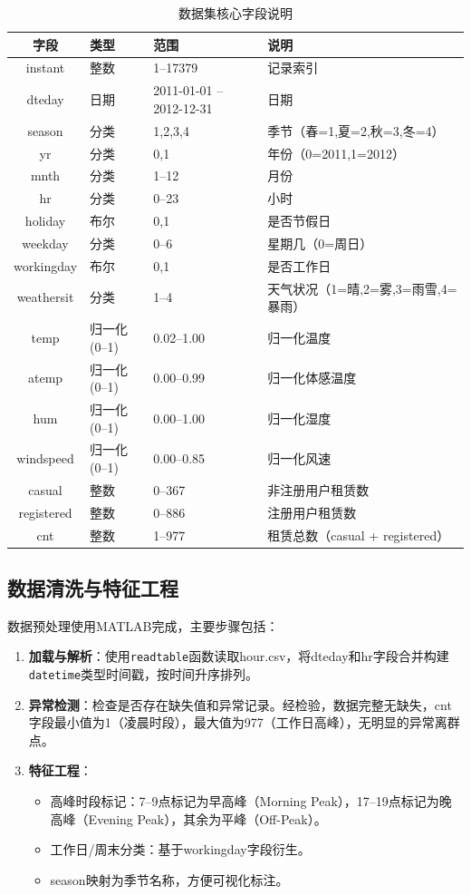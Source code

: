 \documentclass[12pt,a4paper]{article}
\begin{document}
\begin{table}[H]
\centering
\caption{数据集核心字段说明}
\label{tab:fields}
\small
\begin{tabular}{cllp{4cm}}
\toprule
\textbf{字段} & \textbf{类型} & \textbf{范围} & \textbf{说明} \\
\midrule
instant & 整数 & 1--17379 & 记录索引 \\
dteday & 日期 & 2011-01-01 -- 2012-12-31 & 日期 \\
season & 分类 & 1,2,3,4 & 季节（春=1,夏=2,秋=3,冬=4） \\
yr & 分类 & 0,1 & 年份（0=2011,1=2012） \\
mnth & 分类 & 1--12 & 月份 \\
hr & 分类 & 0--23 & 小时 \\
holiday & 布尔 & 0,1 & 是否节假日 \\
weekday & 分类 & 0--6 & 星期几（0=周日） \\
workingday & 布尔 & 0,1 & 是否工作日 \\
weathersit & 分类 & 1--4 & 天气状况（1=晴,2=雾,3=雨雪,4=暴雨） \\
temp & 归一化(0--1) & 0.02--1.00 & 归一化温度 \\
atemp & 归一化(0--1) & 0.00--0.99 & 归一化体感温度 \\
hum & 归一化(0--1) & 0.00--1.00 & 归一化湿度 \\
windspeed & 归一化(0--1) & 0.00--0.85 & 归一化风速 \\
casual & 整数 & 0--367 & 非注册用户租赁数 \\
registered & 整数 & 0--886 & 注册用户租赁数 \\
cnt & 整数 & 1--977 & 租赁总数（casual + registered） \\
\bottomrule
\end{tabular}
\end{table}

\subsection{数据清洗与特征工程}

数据预处理使用MATLAB完成，主要步骤包括：

\begin{enumerate}
  \item \textbf{加载与解析}：使用\texttt{readtable}函数读取hour.csv，将dteday和hr字段合并构建\texttt{datetime}类型时间戳，按时间升序排列。
  \item \textbf{异常检测}：检查是否存在缺失值和异常记录。经检验，数据完整无缺失，cnt字段最小值为1（凌晨时段），最大值为977（工作日高峰），无明显的异常离群点。
  \item \textbf{特征工程}：
  \begin{itemize}
    \item 高峰时段标记：7--9点标记为早高峰（Morning Peak），17--19点标记为晚高峰（Evening Peak），其余为平峰（Off-Peak）。
    \item 工作日/周末分类：基于workingday字段衍生。
    \item season映射为季节名称，方便可视化标注。
  \end{itemize}
\end{enumerate}
\end{document}
